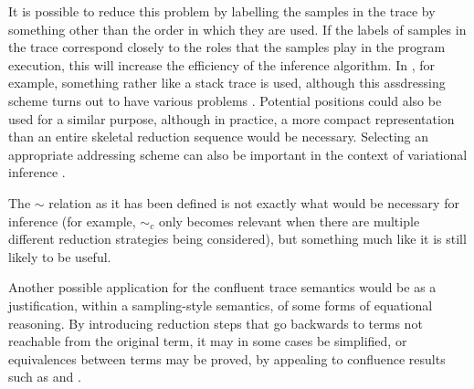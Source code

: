 It is possible to reduce this problem by labelling the samples in the trace by something other than the order in which they are used. If the labels of samples in the trace correspond closely to the roles that the samples play in the program execution, this will increase the efficiency of the inference algorithm. 
In \cite{wingate2011lightweight}, for example, something rather like a stack trace is used, although this assdressing scheme turns out to have various problems \cite{kiselyov2016problems,Hur2015a}. 
Potential positions could also be used for a similar purpose, although in practice, a more compact representation than an entire skeletal reduction sequence would be necessary. 
Selecting an appropriate addressing scheme can also be important in the context of variational inference \cite[\S 6.2.2]{paige2016automatic}.

The $\sim$ relation as it has been defined is not exactly what would be necessary for inference (for example, $\sim_c$ only becomes relevant when there are multiple different reduction strategies being considered), but something much like it is still likely to be useful.

\medskip

Another possible application for the confluent trace semantics would be as a justification, within a sampling-style semantics, of some forms of equational reasoning. 
By introducing reduction steps that go backwards to terms not reachable from the original term, it may in some cases be simplified, or equivalences between terms may be proved, by appealing to confluence results such as  and .
